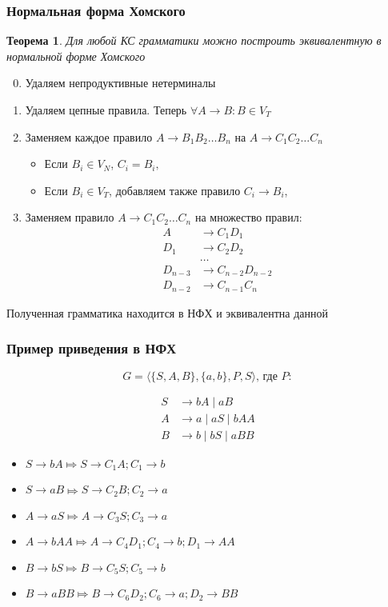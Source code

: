 \documentclass{beamer}
\newtheorem{rutheorem}{Теорема}
\begin{document}
 
\begin{frame}[fragile]
  \transwipe[direction=90]
  \frametitle{Нормальная форма Хомского}    
  
  \begin{rutheorem}   
    Для любой КС грамматики можно построить эквивалентную в нормальной форме Хомского
  \end{rutheorem}

     \begin{enumerate}
      \setcounter{enumi}{-1}
    \item Удаляем непродуктивные нетерминалы
    \item Удаляем цепные правила. Теперь $\forall A \to B: B \in V_T$
    \item Заменяем каждое правило $A \to B_1 B_2 \dots B_n$ на $A \to C_1 C_2 \dots C_n$
    \begin{itemize}
      \item Если $B_i \in V_N$, $C_i = B_i,$ 
      \item Если $B_i \in V_T$, добавляем также правило $C_i \to B_i$, 
    \end{itemize}  
    \item Заменяем правило $A \to C_1 C_2 \dots C_n$ на множество правил: 
    {\small 
    \begin{align*}
      A   &\to C_1 D_1 \\
      D_1 &\to C_2 D_2 \\
          &\dots \\ 
      D_{n-3} &\to C_{n-2} D_{n-2} \\
      D_{n-2} &\to C_{n-1} C_n 
    \end{align*}
    }%
  \end{enumerate}
  
        Полученная грамматика находится в НФХ и эквивалентна данной 
\end{frame}

\begin{frame}[fragile]
  \transwipe[direction=90]
  \frametitle{Пример приведения в НФХ}    
  \[G = \langle \{S, A, B\}, \{a, b\}, P, S\rangle \text{, где } P:\]
  
\begin{align*}
  S &\to bA \mid aB \\
  A &\to a  \mid aS \mid bAA  \\
  B &\to b  \mid bS \mid aBB 
\end{align*}

  \begin{itemize}
    \item $S \to b A \Mapsto S \to C_1 A; C_1 \to b$
    \item $S \to a B \Mapsto S \to C_2 B; C_2 \to a$
    \item $A \to aS \Mapsto A \to C_3 S; C_3 \to a$
    \item $A \to b A A \Mapsto A \to C_4 D_1; C_4 \to b; D_1 \to A A$
    \item $B \to b S \Mapsto B \to C_5 S; C_5 \to b$
    \item $B \to a B B \Mapsto B \to C_6 D_2; C_6 \to a; D_2 \to B B$
  \end{itemize}
\end{frame}
\end{document}

